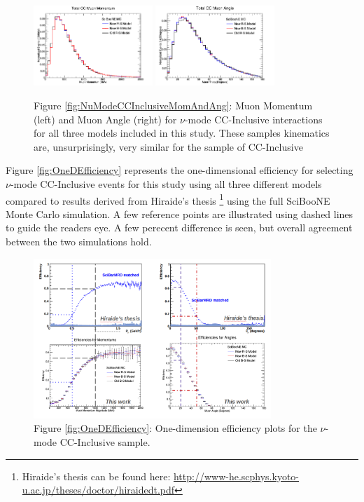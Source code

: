 \documentclass[11pt]{article}
\begin{document}
\begin{figure}[H]
\centering
\includegraphics[width=0.4\textwidth]{CCInclusivePlots/NMCCInclusiveTotalMomentum.png}
\includegraphics[width=0.4\textwidth]{CCInclusivePlots/NMCCInclusiveTotalAngle.png}
\caption*{Figure \ref*{fig:NuModeCCInclusiveMomAndAng}: Muon Momentum (left) and Muon Angle (right) for $\nu$-mode CC-Inclusive interactions for all three models included in this study. These samples kinematics are, unsurprisingly, very similar for the sample of CC-Inclusive}
\end{figure}\label{fig:NuModeCCInclusiveMomAndAng}


Figure \ref{fig:OneDEfficiency} represents the one-dimensional efficiency for selecting $\nu$-mode CC-Inclusive events for this study using all three different models compared to results derived from Hiraide's thesis \footnote{Hiraide's thesis can be found here: \href{http://www-he.scphys.kyoto-u.ac.jp/theses/doctor/hiraide_dt.pdf}{http://www-he.scphys.kyoto-u.ac.jp/theses/doctor/hiraide\textunderscore{}dt.pdf}} using the full SciBooNE Monte Carlo simulation. A few reference points are illustrated using dashed lines to guide the readers eye. A few perecent difference is seen, but overall agreement between the two simulations hold. 

\begin{figure}[H]
\centering
\includegraphics[width=0.8\textwidth]{CCInclusivePlots/CCInc1DEff.png}
\caption*{Figure \ref*{fig:OneDEfficiency}: One-dimension efficiency plots for the $\nu$-mode CC-Inclusive sample.}
\end{figure}\label{fig:OneDEfficiency}
\end{document}
